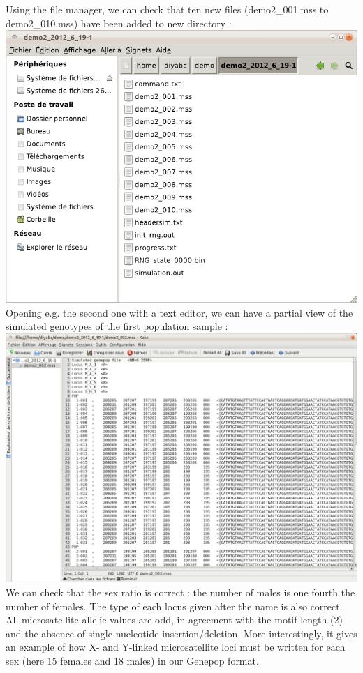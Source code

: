 Using the file manager, we can check that ten new files (\textsf{demo2\_001.mss}
to \textsf{demo2\_010.mss}) have been added to new directory :\\


\includegraphics[scale=0.33]{gui_pictures/Capture-DIYABC-87} \\


Opening e.g. the second one with a text editor, we can have a partial
view of the simulated genotypes of the first population sample : \\


\includegraphics[scale=0.33]{gui_pictures/Capture-DIYABC-88} \\


We can check that the sex ratio is correct : the number of males is
one fourth the number of females. The type of each locus given after
the name is also correct. All microsatellite allelic values are odd,
in agreement with the motif length (2) and the absence of single nucleotide
insertion/deletion. More interestingly, it gives an example of how
X- and Y-linked microsatellite loci must be written for each sex (here
15 females and 18 males) in our Genepop format.

